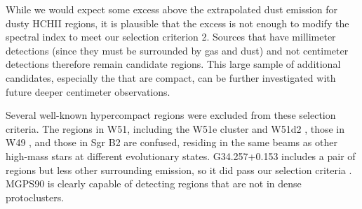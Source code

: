\documentclass[twocolumn]{aastex62}
\begin{document}
While we would expect some excess above the extrapolated dust emission for
dusty HCHII regions, it is plausible that the excess is not enough to modify
the spectral index to meet our selection criterion 2.  Sources that have
millimeter detections (since they must be surrounded by gas and dust) and not
centimeter detections therefore remain candidate \hchii regions.  This large
sample of \mmdetectionscmnondetections additional candidates, especially the
\mmdetectionscmnondetectionscompact that are compact, can be further
investigated with future deeper centimeter observations.

Several well-known hypercompact \hii regions were excluded from these selection
criteria.  The \hchii regions in W51, including the W51e cluster and W51d2
\citep{Ginsburg2016a}, those in W49 \citep{De-Pree1997a}, and those in Sgr B2
\citep{De-Pree1998a} are confused, residing in the same beams as other
high-mass stars at different evolutionary states.  G34.257+0.153 includes a pair
of \hchii regions but less other surrounding emission, so it did pass our selection
criteria \citep{Sewilo2004a,Avalos2006a}.  MGPS90 is clearly capable of detecting
\hchii regions that are not in dense protoclusters.




% 
% 
% 


\end{document}
